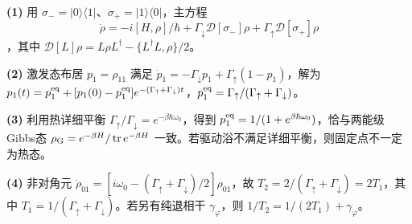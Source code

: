 \par\noindent\textbf{(1)} 用 \(\sigma_-=|0\rangle\langle1|\)、\(\sigma_+=|1\rangle\langle0|\)，主方程 \[\dot\rho=-i[H,\rho]/\hbar+\Gamma_\downarrow\mathcal D[\sigma_-]\rho+\Gamma_\uparrow\mathcal D[\sigma_+]\rho\]，其中 \(\mathcal D[L]\rho=L\rho L^\dagger-\{L^\dagger L,\rho\}/2\)。
\par\noindent\textbf{(2)} 激发态布居 \(p_1=\rho_{11}\) 满足 \(\dot p_1=-\Gamma_\downarrow p_1+\Gamma_\uparrow(1-p_1)\)，解为 \(p_1(t)=p_1^{\rm eq}+[p_1(0)-p_1^{\rm eq}]e^{-(\Gamma_\uparrow+\Gamma_\downarrow)t}\)，\(p_1^{\rm eq}=\Gamma_\uparrow/(\Gamma_\uparrow+\Gamma_\downarrow)\)。
\par\noindent\textbf{(3)} 利用热详细平衡 \(\Gamma_\uparrow/\Gamma_\downarrow=e^{-\beta\hbar\omega_0}\)，得到 \(p_1^{\rm eq}=1/(1+e^{\beta\hbar\omega_0})\)，恰与两能级Gibbs态 \(\rho_{\rm G}=e^{-\beta H}/\operatorname{tr}e^{-\beta H}\) 一致。若驱动浴不满足详细平衡，则固定点不一定为热态。
\par\noindent\textbf{(4)} 非对角元 \(\dot\rho_{01}=[i\omega_0-(\Gamma_\uparrow+\Gamma_\downarrow)/2]\rho_{01}\)，故 \(T_2=2/(\Gamma_\uparrow+\Gamma_\downarrow)=2T_1\)，其中 \(T_1=1/(\Gamma_\uparrow+\Gamma_\downarrow)\)。若另有纯退相干 \(\gamma_\varphi\)，则 \(1/T_2=1/(2T_1)+\gamma_\varphi\)。

